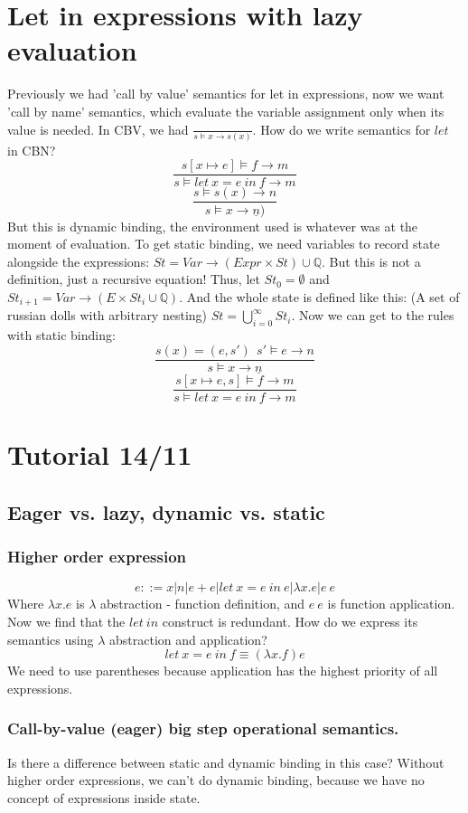 \documentclass{article}
\begin{document}
\section{Let in expressions with lazy evaluation}
Previously we had 'call by value' semantics for let in expressions, now we want 'call by name' semantics, which evaluate the variable assignment only when its value is needed. In CBV, we had $\frac{}{s\vDash x\rightarrow s(x)}$. How do we write semantics for $ let $ in CBN?
$$\frac{s[x\mapsto e]\vDash f\rightarrow m}{s\vDash let\ x = e\ in\ f\rightarrow m}$$
$$\frac{s\vDash s(x)\rightarrow n}{s\vDash x\rightarrow \underline{n})}$$
But this is dynamic binding, the environment used is whatever was at the moment of evaluation.
To get static binding, we need variables to record state alongside the expressions: $ St=Var\rightarrow(Expr\times St)\cup \mathbb{Q} $. But this is not a definition, just a recursive equation! Thus, let $St_0=\emptyset$ and $ St_{i+1} = Var\rightarrow(E\times St_i \cup \mathbb{Q}) $. And the whole state is defined like this: (A set of russian dolls with arbitrary nesting) $ St=\bigcup_{i=0}^\infty St_i $.
Now we can get to the rules with static binding:
$$\frac{s(x)=(e,s')\ \ s'\vDash e\rightarrow n}{s\vDash x\rightarrow \underline{n}}$$
$$\frac{s[x\mapsto e, s]\vDash f\rightarrow m}{s\vDash let\ x = e\ in\ f\rightarrow m}$$

\section{Tutorial 14/11}
\subsection{Eager vs. lazy, dynamic vs. static}
\subsubsection{Higher order expression}
$$e::=x|n|e+e|let\ x=e\ in\ e | \lambda x.e|e\ e$$
Where $ \lambda x.e $ is $\lambda$ abstraction - function definition, and $e\ e$ is function application.
Now we find that the $let\ in$ construct is redundant. How do we express its semantics using $ \lambda $ abstraction and application?
$$let\ x = e\ in\ f \equiv (\lambda x.f) e$$
We need to use parentheses because application has the highest priority of all expressions.
\subsubsection{Call-by-value (eager) big step operational semantics.}
Is there a difference between static and dynamic binding in this case?
Without higher order expressions, we can't do dynamic binding, because we have no concept of expressions inside state. 
\end{document}
